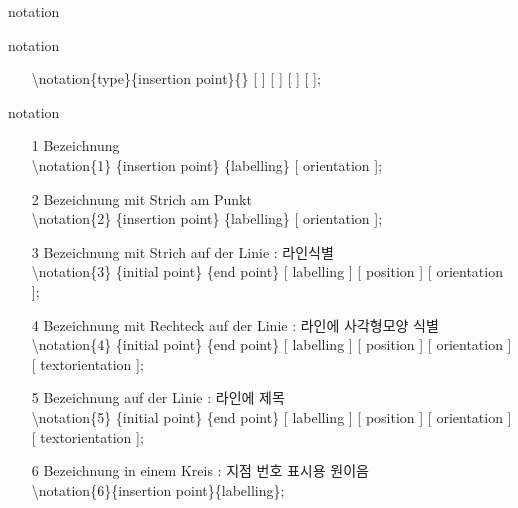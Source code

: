 \documentclass[ aspectratio=169,  12pt,blue,xcolor=pdftex,dvipsnames,table,handout,notes]{beamer}
\begin{document}
		\begin{frame}[t]{notation}
 
			\begin{block}{notation}
			\begin{itemize}
			\item[] \textbackslash notation\{type\}\{insertion point\}\{\} [ ] [ ]  [ ]  [ ];
			\end{itemize}
			\end{block}


			\begin{block}{notation}
			\begin{itemize}
			\item[1] Bezeichnung\\
					\hspace {0.5cm} \textbackslash 	notation\{1\}
									\{insertion point\} \{labelling\} [ orientation ];
			\item[2] Bezeichnung mit Strich am Punkt\\
					\hspace {0.5cm} \textbackslash 	notation\{2\}
									\{insertion point\}
									\{labelling\}
									[ orientation ];
			\item[3] Bezeichnung mit Strich auf der Linie : 라인식별 \\
					\hspace {0.5cm} \textbackslash 	notation\{3\}
									\{initial point\}
									\{end point\}
									[ labelling ] [ position ] [ orientation ];
			\item[4] Bezeichnung mit Rechteck auf der Linie : 라인에 사각형모양 식별\\
					\hspace {0.5cm} \textbackslash 	notation\{4\}
									\{initial point\}
									\{end point\}
									[ labelling ]
									[ position ]
									[ orientation ]
									[ textorientation ];
			\item[5] Bezeichnung auf der Linie : 라인에 제목\\
					\hspace {0.5cm} \textbackslash 	notation\{5\}
									\{initial point\}
									\{end point\}
									[ labelling ]
									[ position ]
									[ orientation ]
									[ textorientation ];
			\item[6] Bezeichnung in einem Kreis : 지점 번호 표시용 원이음\\
					\hspace {0.5cm} \textbackslash notation\{6\}\{insertion point\}\{labelling\};
			\end{itemize}
			\end{block}


			\begin{columns}[t]


\end{columns}
\end{frame}
\end{document}

